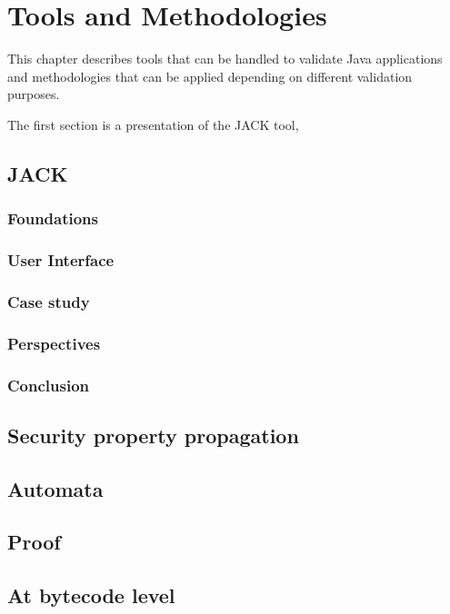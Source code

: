 \chapter{Tools and Methodologies}
This chapter describes tools that can be handled to validate Java applications and methodologies that can be applied depending on different validation purposes.

The first section is a presentation of the JACK tool,
\section{JACK}

\subsection{Foundations}

\subsection{User Interface}

\subsection{Case study}

\subsection{Perspectives}

\subsection{Conclusion}


\section{Security property propagation}




%


\section{Automata}


\section{Proof}

\section{At bytecode level}








